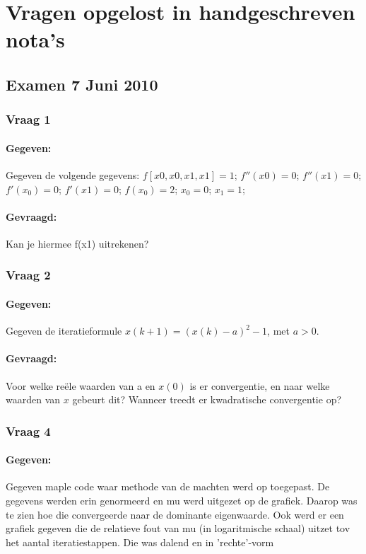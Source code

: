 \documentclass[12pt]{article}
\begin{document}
\section{Vragen opgelost in handgeschreven nota's}
\subsection{Examen 7 Juni 2010}
\subsubsection{Vraag 1}
\paragraph{Gegeven:} Gegeven de volgende gegevens:
$f[x0,x0,x1,x1] = 1$; $f''(x0)=0$; $f''(x1)=0$; $f'(x_0)=0$; $f'(x1)=0$; $f(x_0)=2$; $x_0=0$; $x_1=1$;
\paragraph{Gevraagd:} Kan je hiermee f(x1) uitrekenen?
\subsubsection{Vraag 2}
\paragraph{Gegeven:}
Gegeven de iteratieformule $x(k+1) = (x(k) - a)^2 - 1$, met $a > 0$.
\paragraph{Gevraagd:} Voor welke reële waarden van a en $x(0)$ is er convergentie, en naar welke waarden van $x$ gebeurt dit? Wanneer treedt er kwadratische convergentie op?
\subsubsection{Vraag 4}
\paragraph{Gegeven:} Gegeven maple code waar methode van de machten werd op toegepast. De gegevens werden erin genormeerd en mu werd uitgezet op de grafiek. Daarop was te zien hoe die convergeerde naar de dominante eigenwaarde. Ook werd er een grafiek gegeven die de relatieve fout van mu (in logaritmische schaal) uitzet tov het aantal iteratiestappen. Die was dalend en in 'rechte'-vorm
\end{document}
